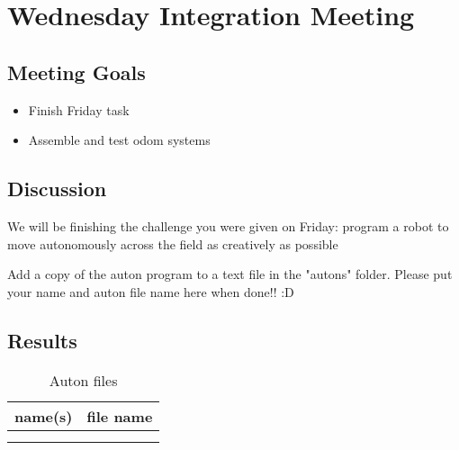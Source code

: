 \section{Wednesday Integration Meeting}

\subsection{Meeting Goals}
\begin{itemize}
    \item Finish Friday task
    \item Assemble and test odom systems
\end{itemize}

\subsection{Discussion}
We will be finishing the challenge you were given on Friday:
program a robot to move autonomously across the field as creatively as possible

Add a copy of the auton program to a text file in the "autons" folder.
Please put your name and auton file name here when done!! :D


\subsection{Results}
\begin{table}
    \centering
    \begin{tabular}{|c|c|}
        \hline
        name(s) & file name \\
        \hline
         &  \\
         &  \\
        \hline
    \end{tabular}
    \caption{Auton files}
    \label{tab:auton_files}
\end{table}